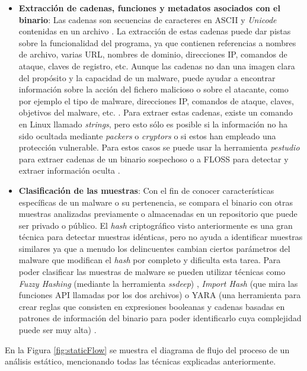 \begin{itemize}
    \item \textbf{Extracción de cadenas, funciones y metadatos asociados con el binario}: Las cadenas son secuencias de caracteres en \gls{ASCII} y \textit{Unicode} contenidas en un archivo \cite{101}. La extracción de estas cadenas  puede dar pistas sobre la funcionalidad del programa, ya que contienen referencias a nombres de archivo, varias \gls{URL}, nombres de dominio, direcciones \gls{IP}, comandos de ataque, claves de registro, etc. Aunque las cadenas no dan una imagen clara del propósito y la capacidad de un malware, puede ayudar a encontrar información sobre la acción del fichero malicioso o sobre el atacante, como por ejemplo el tipo de malware, direcciones \gls{IP}, comandos de ataque, claves, objetivos del malware, etc. \cite{LMA2018}. Para extraer estas cadenas, existe un comando en Linux llamado \textit{strings}, pero esto sólo es posible si la información no ha sido ocultada mediante \textit{packers} o \textit{cryptors} o si estos han empleado una protección vulnerable. Para estos casos se puede usar la herramienta \textit{pestudio} para extraer cadenas de un binario sospechoso o a \gls{FLOSS} para detectar y extraer información oculta \cite{102}.
    
    \item \textbf{Clasificación de las muestras}: Con el fin de conocer características específicas de un malware o su pertenencia, se compara el binario con otras muestras analizadas previamente o almacenadas en un repositorio que puede ser privado o público. El \textit{hash} criptográfico visto anteriormente es una gran técnica para detectar muestras idénticas, pero no ayuda a identificar muestras similares ya que a menudo los delincuentes cambian ciertos parámetros del malware que modifican el \textit{hash} por completo y dificulta esta tarea. Para poder clasificar las muestras de malware se pueden utilizar técnicas como \textit{Fuzzy Hashing} (mediante la herramienta \textit{ssdeep}) \cite{104}, \textit{Import Hash} (que mira las funciones \gls{API} llamadas por los dos archivos)  \cite{105} o YARA (una herramienta para crear reglas que consisten en expresiones booleanas y cadenas basadas en patrones de información del binario para poder identificarlo cuya complejidad puede ser muy alta) \cite{YARADOC} \cite{77}. 
\end{itemize}

En la Figura \ref{fig:staticFlow} se muestra el diagrama de flujo del proceso de un análisis estático, mencionando todas las técnicas explicadas anteriormente.

